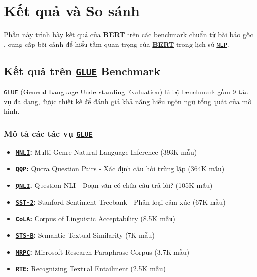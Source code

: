 \section{Kết quả và So sánh}
\label{sec:ket_qua_so_sanh}

Phần này trình bày kết quả của \hyperref[acro:bert]{\textbf{BERT}} trên các benchmark chuẩn từ bài báo gốc \cite{devlin2018bert}, cung cấp bối cảnh để hiểu tầm quan trọng của \hyperref[acro:bert]{\textbf{BERT}} trong lịch sử \hyperref[acro:nlp]{\texttt{NLP}}.

\subsection{Kết quả trên \hyperref[acro:glue]{\texttt{GLUE}} Benchmark}
\label{ssec:ket_qua_glue}

\hyperref[acro:glue]{\texttt{GLUE}} (General Language Understanding Evaluation) \cite{wang2018glue} là bộ benchmark gồm 9 tác vụ đa dạng, được thiết kế để đánh giá khả năng hiểu ngôn ngữ tổng quát của mô hình.

\subsubsection{Mô tả các tác vụ \hyperref[acro:glue]{\texttt{GLUE}}}
\begin{itemize}
    \item \textbf{\hyperref[acro:mnli]{\texttt{MNLI}}:} Multi-Genre Natural Language Inference (393K mẫu)
    \item \textbf{\hyperref[acro:qqp]{\texttt{QQP}}:} Quora Question Pairs - Xác định câu hỏi trùng lặp (364K mẫu)
    \item \textbf{\hyperref[acro:qnli]{\texttt{QNLI}}:} Question NLI - Đoạn văn có chứa câu trả lời? (105K mẫu)
    \item \textbf{\hyperref[acro:sst2]{\texttt{SST-2}}:} Stanford Sentiment Treebank - Phân loại cảm xúc (67K mẫu)
    \item \textbf{\hyperref[acro:cola]{\texttt{CoLA}}:} Corpus of Linguistic Acceptability (8.5K mẫu)
    \item \textbf{\hyperref[acro:stsb]{\texttt{STS-B}}:} Semantic Textual Similarity (7K mẫu)
    \item \textbf{\hyperref[acro:mrpc]{\texttt{MRPC}}:} Microsoft Research Paraphrase Corpus (3.7K mẫu)
    \item \textbf{\hyperref[acro:rte]{\texttt{RTE}}:} Recognizing Textual Entailment (2.5K mẫu)
\end{itemize}

